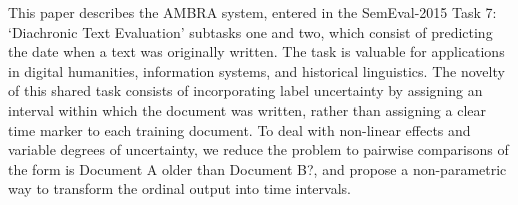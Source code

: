 This paper describes the AMBRA system, entered in the SemEval-2015 Task 7: `Diachronic Text Evaluation' subtasks one and two, which consist of predicting the date when a text was originally written. The task is valuable for applications in digital humanities, information systems, and historical linguistics. The novelty of this shared task consists of incorporating label uncertainty by assigning an interval within which the document was written, rather than assigning a clear time marker to each training document. To deal with non-linear effects and variable degrees of uncertainty, we reduce the problem to pairwise comparisons of the form is Document A older than Document B?, and propose a non-parametric way to transform the ordinal output into time intervals.

